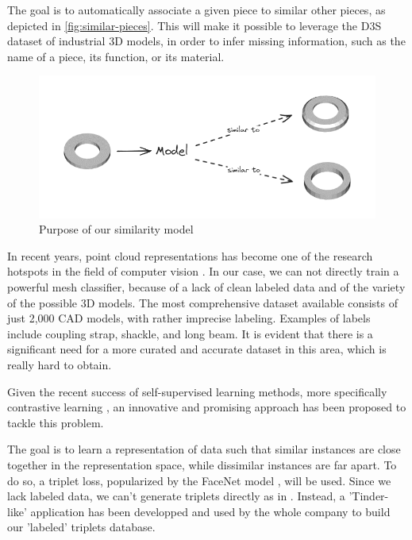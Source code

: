 The goal is to automatically associate a given piece to similar other pieces, as depicted in \autoref{fig:similar-pieces}. This will make it possible to leverage the D3S dataset of industrial 3D models, in order to infer missing information, such as the name of a piece, its function, or its material.

\begin{figure}[]
    \centering
    \includegraphics[width=0.8\columnwidth]{images/similar-pieces.png}
    \caption{Purpose of our similarity model}
    \label{fig:similar-pieces}
\end{figure}

In recent years, point cloud representations has become one of the research hotspots in the field of computer vision \cite{zhangDeepLearningbased3D2023}.
In our case, we can not directly train a powerful mesh classifier, because of a lack of clean labeled data and of the variety of the possible 3D models.
The most comprehensive dataset available consists of just 2,000 CAD models, with rather imprecise labeling. Examples of labels include coupling strap, shackle, and long beam. It is evident that there is a significant need for a more curated and accurate dataset in this area, which is really hard to obtain.

Given the recent success of self-supervised learning methods, more specifically contrastive learning \cite{radfordLearningTransferableVisual2021,yuPointBERTPretraining3D2022,liuOpenShapeScaling3D2023}, an innovative and promising approach has been proposed to tackle this problem.

The goal is to learn a representation of data such that similar instances are close together in the representation space, while dissimilar instances are far apart. To do so, a triplet loss, popularized by the FaceNet model \cite{schroffFaceNetUnifiedEmbedding2015}, will be used. Since we lack labeled data, we can't generate triplets directly as in \cite{schroffFaceNetUnifiedEmbedding2015}. Instead, a 'Tinder-like' application has been developped and used by the whole company to build our 'labeled' triplets database.

